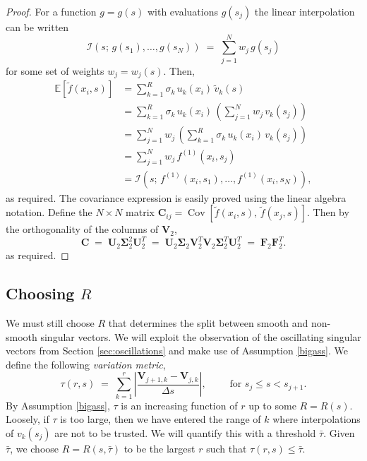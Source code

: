 \documentclass[final]{siamltex}
\providecommand{\mat}[1]{\boldsymbol{#1}}
\providecommand{\mC}{\ensuremath{\mat{C}}}
\providecommand{\mF}{\ensuremath{\mat{F}}}
\providecommand{\mU}{\ensuremath{\mat{U}}}
\providecommand{\mV}{\ensuremath{\mat{V}}}
\providecommand{\mSigma}{\ensuremath{\mat{\Sigma}}}
\begin{document}
\begin{proof}
For a function $g=g(s)$ with evaluations $g(s_j)$ the linear
interpolation can be written
\begin{equation}
{\mathcal{I}}(s;\,g(s_1),\dots,g(s_N)) \;=\; \sum_{j=1}^N w_j\,g(s_j)
\end{equation}
for some set of weights $w_j=w_j(s)$. Then,
\begin{equation}
\begin{aligned}
{\mathbb{E}\left[{\tilde{f}(x_i,s)}\right]} &= \sum_{k=1}^R \sigma_k\,u_k(x_i)\,\tilde{v}_k(s) \\
&= \sum_{k=1}^R \sigma_k\,u_k(x_i)\, \left(\sum_{j=1}^N w_j\,v_k(s_j)\right) \\
&= \sum_{j=1}^N w_j\,\left(\sum_{k=1}^R \sigma_k\,u_k(x_i)\,v_k(s_j)\right) \\
&= \sum_{j=1}^N w_j\, f^{(1)}(x_i,s_j) \\
&= {\mathcal{I}}\left(s;\,f^{(1)}(x_i,s_1),\dots,f^{(1)}(x_i,s_N)\right),
\end{aligned}
\end{equation}
as required. The covariance expression is easily proved using the
linear algebra notation. Define the $N\times N$ matrix $\mC_{ij} =
{\operatorname{Cov}\left[{\tilde{f}(x_i,s)},\,{\tilde{f}(x_j,s)}\right]}$. Then by the orthogonality
of the columns of $\mV_2$,
\begin{equation}
\mC \;=\; \mU_2\mSigma_2^2\mU_2^T \;=\;
\mU_2\mSigma_2\mV_2^T\mV_2\mSigma_2^T\mU_2^T \;=\; \mF_2\mF_2^T.
\end{equation}
as required.
\end{proof}

\subsection{Choosing $R$}
\label{sec:chooseR}
We must still choose $R$ that determines the split between smooth and
non-smooth singular vectors. We will exploit the observation of the
oscillating singular vectors from Section \ref{sec:oscillations} and
make use of Assumption \ref{bigass}. We define the following
\emph{variation metric},
\begin{equation}
\label{eq:deftau}
\tau(r,s) \;=\; \sum_{k=1}^r \left| \frac{\mV_{j+1,k} - \mV_{j,k}}{\Delta s}
\right|,\qquad\mbox{ for $s_j \leq s < s_{j+1}$.}
\end{equation}
By Assumption \ref{bigass}, $\tau$ is an increasing function of $r$ up
to some $R=R(s)$. Loosely, if $\tau$ is too large, then we have
entered the range of $k$ where interpolations of $v_k(s_j)$ are not to
be trusted. We will quantify this with a threshold $\bar{\tau}$.
Given $\bar{\tau}$, we choose $R=R(s,\bar{\tau})$ to be the largest
$r$ such that $\tau(r,s)\leq \bar{\tau}$.
\end{document}
